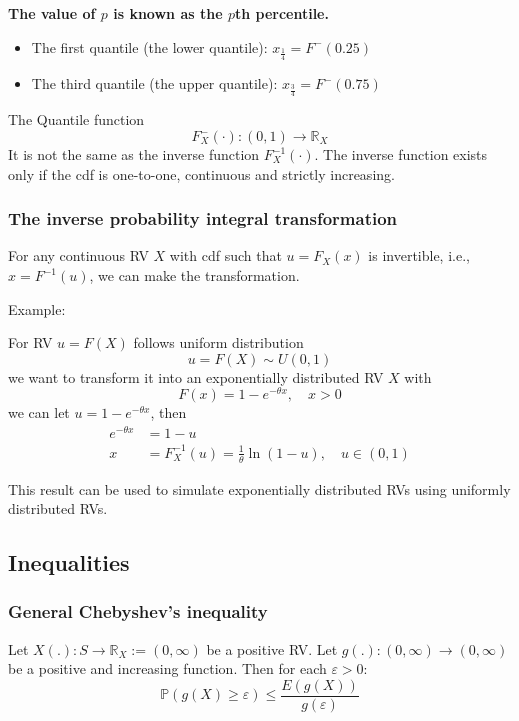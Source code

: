 \documentclass[12pt]{article}
\begin{document}
{\textbf {The value of $ p $ is known as the $ p $th percentile.}}
\begin{itemize}
\item The first quantile (the lower quantile): $ x_{\frac{1}{4}} = F^{-}(0.25) $
\item The third quantile (the upper quantile): $ x_{\frac{3}{4}} = F^{-}(0.75) $
\end{itemize}

The Quantile function
\begin{equation*}
F^{ - }_{X}(\cdot ): (0,1)\rightarrow \mathbb{R}_{X}
\end{equation*}
It is not the same as the inverse function $ F^{ - 1}_{X}(\cdot ) $.
The inverse function exists only if the cdf is one-to-one, continuous and strictly
increasing.



\subsubsection{The inverse probability integral transformation}
For any continuous RV $ X $ with cdf such that $ u = F_{X}(x) $ is invertible, 
i.e., $ x = F^{ - 1}(u) $, we can make the transformation.

Example:

For RV $ u = F(X) $ follows uniform distribution
\begin{equation*}
u = F(X) \sim U(0,1)
\end{equation*}
we want to transform it into an exponentially distributed RV $ X $ with 
\begin{equation*}
F(x) = 1 - e^{ - \theta x}, \quad x > 0
\end{equation*}
we can let $ u = 1 - e^{ - \theta x} $, then
\begin{align*}
e^{ - \theta x} &= 1 - u\\
x &= F_{X}^{ - 1}(u) =  \frac{1}{\theta}\ln (1 - u), \quad u \in (0,1)
\end{align*}

This result can be used to simulate exponentially distributed RVs using uniformly
distributed RVs.




\subsection{Inequalities}

\subsubsection{General Chebyshev's inequality}
Let $ X(.): S \rightarrow \mathbb{R}_{X}:=(0, \infty ) $ be a positive RV. Let
$ g(.):(0,\infty ) \rightarrow (0,\infty ) $ be a positive and increasing function.
Then for each $ \varepsilon > 0 $:
\begin{equation*}
\mathbb{P}(g(X) \ge  \varepsilon)	\le \frac{E(g(X))}{g(\varepsilon)}
\end{equation*}
\end{document}
